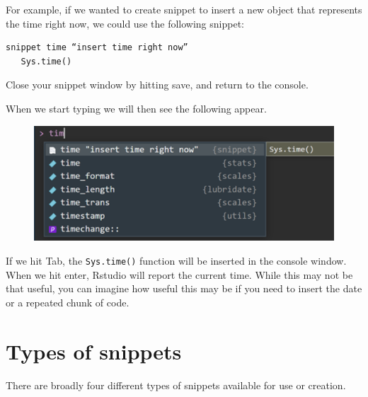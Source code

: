 \documentclass[
  letterpaper,
  DIV=11,
  numbers=noendperiod]{scrreprt}
\begin{document}
For example, if we wanted to create snippet to insert a new object that
represents the time right now, we could use the following snippet:

\begin{verbatim}
snippet time “insert time right now”     
   Sys.time()
\end{verbatim}

Close your snippet window by hitting save, and return to the console.

When we start typing we will then see the following appear.

\begin{figure}

{\centering \includegraphics{./images/r_setup-snippet_insert.png}

}

\end{figure}

If we hit Tab, the \texttt{Sys.time()} function will be inserted in the
console window. When we hit enter, Rstudio will report the current time.
While this may not be that useful, you can imagine how useful this may
be if you need to insert the date or a repeated chunk of code.

\hypertarget{types-of-snippets}{%
\section{Types of snippets}\label{types-of-snippets}}

There are broadly four different types of snippets available for use or
creation.
\end{document}
